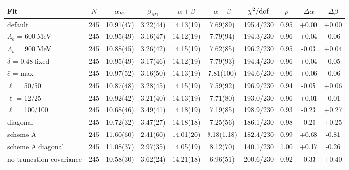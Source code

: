 \begin{tabular}{lccccccccc}
\hline
Fit & $N$ & $\alpha_{E1}$ & $\beta_{M1}$ & $\alpha+\beta$ & $\alpha-\beta$ & $\chi^2/{\rm dof}$ & $p$ & $\Delta\alpha$ & $\Delta\beta$ \\
\hline
default & 245 & 10.91(47) & 3.22(44) & 14.13(19) & 7.69(89) & 195.4/230 & 0.95 & +0.00 & +0.00 \\
$\Lambda_b$ = 600 MeV & 245 & 10.95(49) & 3.16(47) & 14.12(19) & 7.79(94) & 194.3/230 & 0.96 & +0.04 & -0.06 \\
$\Lambda_b$ = 900 MeV & 245 & 10.88(45) & 3.26(42) & 14.15(19) & 7.62(85) & 196.2/230 & 0.95 & -0.03 & +0.04 \\
$\delta$ = 0.48 fixed & 245 & 10.95(49) & 3.17(46) & 14.12(19) & 7.79(93) & 194.4/230 & 0.96 & +0.04 & -0.05 \\
$\bar c$ = max & 245 & 10.97(52) & 3.16(50) & 14.13(19) & 7.81(100) & 194.6/230 & 0.96 & +0.06 & -0.06 \\
$\ell$ = 50/50 & 245 & 10.87(48) & 3.28(45) & 14.15(19) & 7.59(92) & 196.9/230 & 0.94 & -0.05 & +0.06 \\
$\ell$ = 12/25 & 245 & 10.92(42) & 3.21(40) & 14.13(19) & 7.71(80) & 193.0/230 & 0.96 & +0.01 & -0.01 \\
$\ell$ = 100/100 & 245 & 10.68(46) & 3.49(41) & 14.18(19) & 7.19(85) & 198.9/230 & 0.93 & -0.23 & +0.27 \\
diagonal & 245 & 10.72(32) & 3.47(27) & 14.18(18) & 7.25(56) & 186.1/230 & 0.98 & -0.20 & +0.25 \\
scheme A & 245 & 11.60(60) & 2.41(60) & 14.01(20) & 9.18(1.18) & 182.4/230 & 0.99 & +0.68 & -0.81 \\
scheme A diagonal & 245 & 11.08(37) & 2.97(35) & 14.05(19) & 8.12(70) & 140.1/230 & 1.00 & +0.17 & -0.26 \\
no truncation covariance & 245 & 10.58(30) & 3.62(24) & 14.21(18) & 6.96(51) & 200.6/230 & 0.92 & -0.33 & +0.40 \\
\hline
\end{tabular}

